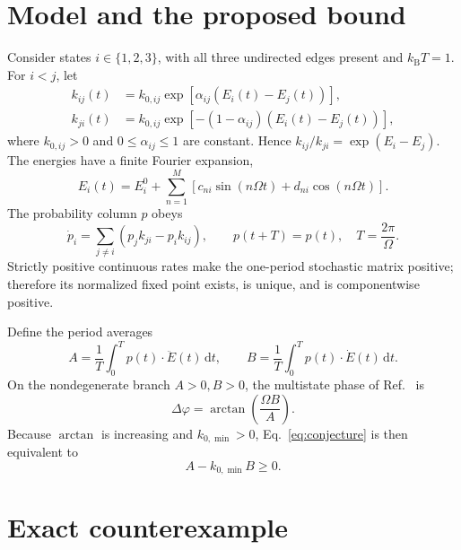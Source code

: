\documentclass[11pt]{article}
\newcommand{\dd}{\mathrm{d}}
\begin{document}
\section{Model and the proposed bound}

Consider states \(i\in\{1,2,3\}\), with all three undirected edges present and
\(k_{\mathrm B}T=1\).  For \(i<j\), let
\begin{align}
 k_{ij}(t)&=k_{0,ij}\exp\!\left[\alpha_{ij}(E_i(t)-E_j(t))\right],
 \label{eq:rate-forward}\\
 k_{ji}(t)&=k_{0,ij}\exp\!\left[-(1-\alpha_{ij})(E_i(t)-E_j(t))\right],
 \label{eq:rate-backward}
\end{align}
where \(k_{0,ij}>0\) and \(0\leq\alpha_{ij}\leq1\) are constant.  Hence
\(k_{ij}/k_{ji}=\exp(E_i-E_j)\).  The energies have a finite Fourier expansion,
\begin{equation}
 E_i(t)=E_i^0+\sum_{n=1}^{M}
 \left[c_{ni}\sin(n\Omega t)+d_{ni}\cos(n\Omega t)\right].
 \label{eq:drive}
\end{equation}
The probability column \(p\) obeys
\begin{equation}
 \dot p_i=\sum_{j\ne i}(p_jk_{ji}-p_ik_{ij}),\qquad
 p(t+T)=p(t),\quad T=\frac{2\pi}{\Omega}.
 \label{eq:master}
\end{equation}
Strictly positive continuous rates make the one-period stochastic matrix positive;
therefore its normalized fixed point exists, is unique, and is componentwise positive.

Define the period averages
\begin{equation}
 A=\frac1T\int_0^T p(t)\mathbin{\cdot}\ddot E(t)\,\dd t,
 \qquad
 B=\frac1T\int_0^T p(t)\mathbin{\cdot}\dot E(t)\,\dd t.
 \label{eq:AB}
\end{equation}
On the nondegenerate branch \(A>0,B>0\), the multistate phase of
Ref.~\cite{deguenther2022phase} is
\begin{equation}
 \Delta\varphi=\arctan\!\left(\frac{\Omega B}{A}\right).
 \label{eq:phase}
\end{equation}
Because \(\arctan\) is increasing and \(k_{0,\min}>0\), Eq.~\eqref{eq:conjecture}
is then equivalent to
\begin{equation}
 A-k_{0,\min}B\geq0.
 \label{eq:margin}
\end{equation}

\section{Exact counterexample}
\end{document}
